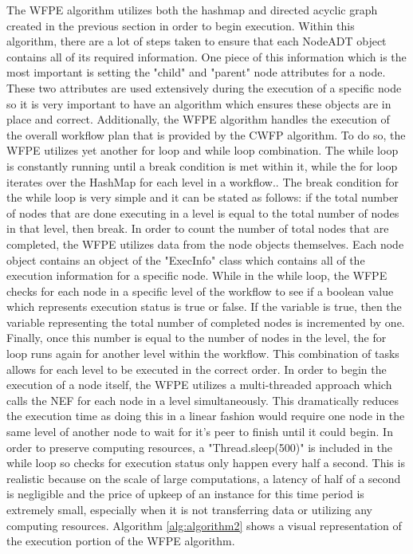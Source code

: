 \documentclass[fleqn,10pt]{SelfArx} %
\begin{document}
The WFPE algorithm utilizes both the hashmap and directed acyclic graph created in the previous section in order to begin execution. Within this algorithm, there are a lot of steps taken to ensure that each NodeADT object contains all of its required information. One piece of this information which is the most important is setting the "child" and "parent" node attributes for a node. These two attributes are used extensively during the execution of a specific node so it is very important to have an algorithm which ensures these objects are in place and correct. Additionally, the WFPE algorithm handles the execution of the overall workflow plan that is provided by the CWFP algorithm. To do so, the WFPE utilizes yet another for loop and while loop combination. The while loop is constantly running until a break condition is met within it, while the for loop iterates over the HashMap for each level in a workflow.. The break condition for the while loop is very simple and it can be stated as follows: if the total number of nodes that are done executing in a level is equal to the total number of nodes in that level, then break. In order to count the number of total nodes that are completed, the WFPE utilizes data from the node objects themselves. Each node object contains an object of the "ExecInfo" class which contains all of the execution information for a specific node. While in the while loop, the WFPE checks for each node in a specific level of the workflow to see if a boolean value which represents execution status is true or false. If the variable is true, then the variable representing the total number of completed nodes is incremented by one. Finally, once this number is equal to the number of nodes in the level, the for loop runs again for another level within the workflow. This combination of tasks allows for each level to be executed in the correct order. In order to begin the execution of a node itself, the WFPE utilizes a multi-threaded approach which calls the NEF for each node in a level simultaneously. This dramatically reduces the execution time as doing this in a linear fashion would require one node in the same level of another node to wait for it's peer to finish until it could begin. In order to preserve computing resources, a "Thread.sleep(500)" is included in the while loop so checks for execution status only happen every half a second. This is realistic because on the scale of large computations, a latency of half of a second is negligible and the price of upkeep of an instance for this time period is extremely small, especially when it is not transferring data or utilizing any computing resources. Algorithm \ref{alg:algorithm2} shows a visual representation of the execution portion of the WFPE algorithm.
\end{document}
